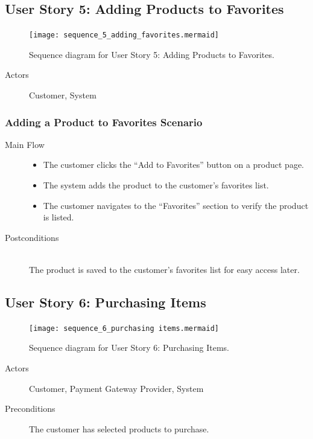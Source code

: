 \documentclass[twoside,a4paper,journal]{IEEEtran}
\begin{document}
\subsection{User Story 5: Adding Products to Favorites}
\begin{figure}[!t]
\centering
\texttt{[image: sequence\_5\_adding\_favorites.mermaid]}
\caption{Sequence diagram for User Story 5: Adding Products to Favorites.}
\label{fig:sequence_5}
\end{figure}
\begin{description}
  \item[Actors] Customer, System
\end{description}
\subsubsection{Adding a Product to Favorites Scenario}
\begin{description}
  \item[Main Flow] \hfill
    \begin{itemize}
      \item The customer clicks the ``Add to Favorites'' button on a product
        page.
      \item The system adds the product to the customer's favorites list.
      \item The customer navigates to the ``Favorites'' section to verify the
        product is listed.
    \end{itemize}
  \item[Postconditions] \hfill \\
    The product is saved to the customer's favorites list for easy access later.
\end{description}

\subsection{User Story 6: Purchasing Items}
\begin{figure}[!t]
\centering
\texttt{[image: sequence\_6\_purchasing items.mermaid]}
\caption{Sequence diagram for User Story 6: Purchasing Items.}
\label{fig:sequence_6}
\end{figure}
\begin{description}
  \item[Actors] Customer, Payment Gateway Provider, System
  \item[Preconditions] \hfill
    The customer has selected products to purchase.
\end{description}
\end{document}
